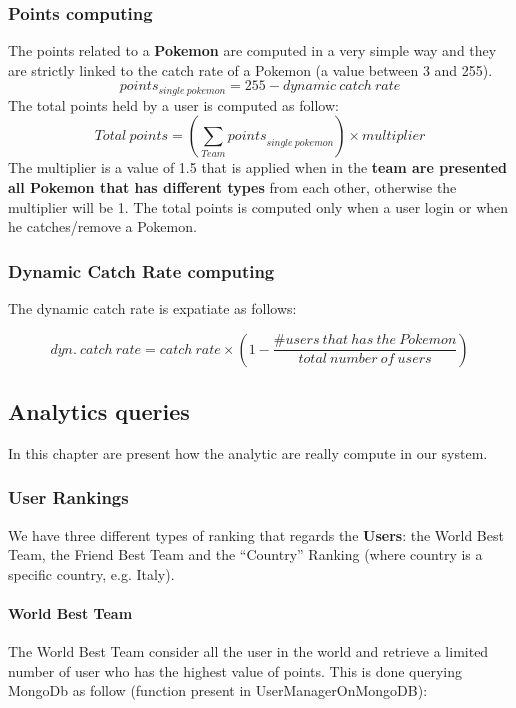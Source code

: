 \subsubsection{Points computing}
The points related to a \textbf{Pokemon} are computed in a very simple way and they are strictly linked to the catch rate of a Pokemon (a value between 3 and 255).
\begin{equation}
	points_{single\ pokemon} = 255 - dynamic\ catch\ rate 
\end{equation}
The total points held by a user is computed as follow:
\begin{equation}
	Total\ points=\left(\sum_{Team}{points}_{single\ pokemon}\right)\times{multiplier}
\end{equation}
The multiplier is a value of 1.5 that is applied when in the\textbf{ team are presented all Pokemon that has different types} from each other, otherwise the multiplier will be 1.
The total points is computed only when a user login or when he catches/remove a Pokemon.

\subsubsection{Dynamic Catch Rate computing}
The dynamic catch rate is expatiate as follows:

\begin{equation}
	dyn.\ catch\ rate= catch\ rate \times \left(1-\frac{\# users\ that\ has\ the\ Pokemon}{total\ number\ of\ users}\right)
\end{equation}
\subsection{Analytics queries}
In this chapter are present how the analytic are really compute in our system.
\subsubsection{User Rankings}
We have three different types of ranking that regards the \textbf{Users}: the World Best Team, the Friend Best Team and the “Country” Ranking (where country is a specific country, e.g. Italy).
\paragraph{World Best Team}
The World Best Team consider all the user in the world and retrieve a limited number of user who has the highest value of points. This is done querying MongoDb as follow (function present in UserManagerOnMongoDB):


